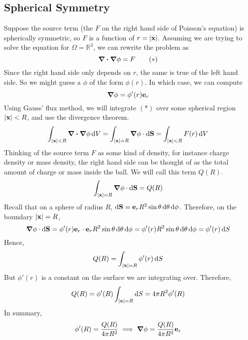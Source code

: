 \subsection{Spherical Symmetry}
Suppose the source term (the \(F\) on the right hand side of Poisson's equation) is spherically symmetric, so \(F\) is a function of \(r = \abs{\vb x}\).
Assuming we are trying to solve the equation for \(\Omega = \mathbb R^3\), we can rewrite the problem as
\begin{equation}
	\div{\grad{\phi}} = F
	\tag{\(\ast\)}
\end{equation}
Since the right hand side only depends on \(r\), the same is true of the left hand side.
So we might guess a \(\phi\) of the form \(\phi(r)\).
In which case, we can compute
\[
	\grad{\phi} = \phi'(r) \vb e_r
\]
Using Gauss' flux method, we will integrate \((\ast)\) over some spherical region \(\abs{\vb x} < R\), and use the divergence theorem.
\[
	\int_{\abs{\vb x} < R} \div{\grad{\phi}}\dd{V} = \int_{\abs{\vb x} = R} \grad{\phi} \cdot \dd{\vb S} = \int_{\abs{\vb x} < R} F(r) \dd{V}
\]
Thinking of the source term \(F\) as some kind of density, for instance charge density or mass density, the right hand side can be thought of as the total amount of charge or mass inside the ball.
We will call this term \(Q(R)\).
\[
	\int_{\abs{\vb x} = R} \grad{\phi} \cdot \dd{\vb S} = Q(R)
\]
Recall that on a sphere of radius \(R\), \(\dd{\vb S} = \vb e_r R^2 \sin\theta \dd{\theta}\dd{\phi}\).
Therefore, on the boundary \(\abs{\vb x} = R\),
\[
	\grad{\phi} \cdot \dd{\vb S} = \phi'(r) \vb e_r \cdot \vb e_r R^2 \sin\theta \dd{\theta}\dd{\phi} = \phi'(r) R^2 \sin\theta \dd{\theta}\dd{\phi} = \phi'(r) \dd{S}
\]
Hence,
\[
	Q(R) = \int_{\abs{\vb x} = R} \phi'(r) \dd{S}
\]
But \(\phi'(r)\) is a constant on the surface we are integrating over.
Therefore,
\[
	Q(R) = \phi'(R) \int_{\abs{\vb x} = R} \dd{S} = 4\pi R^2 \phi'(R)
\]
In summary,
\[
	\phi'(R) = \frac{Q(R)}{4\pi R^2} \implies \grad{\phi} = \frac{Q(R)}{4\pi R^2} \vb e_r
\]

